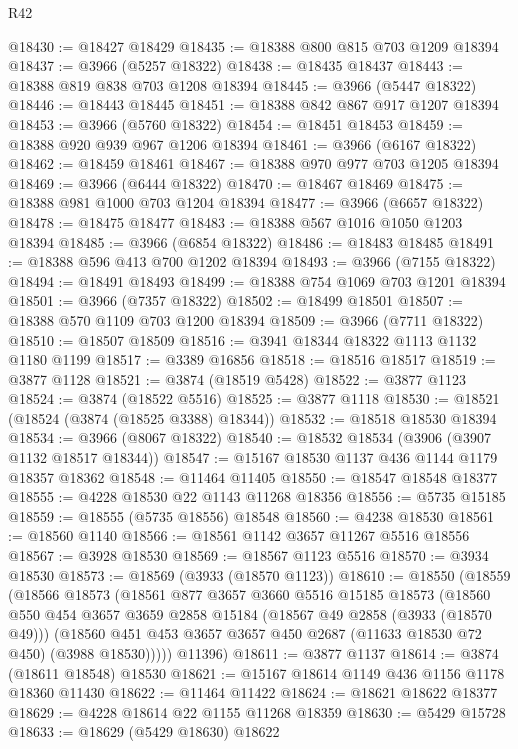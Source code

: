 \begin{lexlean}{R42}
\begin{coremodule}
@18430 := @18427 @18429
@18435 := @18388 @800 @815 @703 @1209 @18394
@18437 := @3966 (@5257 @18322)
@18438 := @18435 @18437
@18443 := @18388 @819 @838 @703 @1208 @18394
@18445 := @3966 (@5447 @18322)
@18446 := @18443 @18445
@18451 := @18388 @842 @867 @917 @1207 @18394
@18453 := @3966 (@5760 @18322)
@18454 := @18451 @18453
@18459 := @18388 @920 @939 @967 @1206 @18394
@18461 := @3966 (@6167 @18322)
@18462 := @18459 @18461
@18467 := @18388 @970 @977 @703 @1205 @18394
@18469 := @3966 (@6444 @18322)
@18470 := @18467 @18469
@18475 := @18388 @981 @1000 @703 @1204 @18394
@18477 := @3966 (@6657 @18322)
@18478 := @18475 @18477
@18483 := @18388 @567 @1016 @1050 @1203 @18394
@18485 := @3966 (@6854 @18322)
@18486 := @18483 @18485
@18491 := @18388 @596 @413 @700 @1202 @18394
@18493 := @3966 (@7155 @18322)
@18494 := @18491 @18493
@18499 := @18388 @754 @1069 @703 @1201 @18394
@18501 := @3966 (@7357 @18322)
@18502 := @18499 @18501
@18507 := @18388 @570 @1109 @703 @1200 @18394
@18509 := @3966 (@7711 @18322)
@18510 := @18507 @18509
@18516 := @3941 @18344 @18322 @1113 @1132 @1180 @1199
@18517 := @3389 @16856
@18518 := @18516 @18517
@18519 := @3877 @1128
@18521 := @3874 (@18519 @5428)
@18522 := @3877 @1123
@18524 := @3874 (@18522 @5516)
@18525 := @3877 @1118
@18530 := @18521 (@18524 (@3874 (@18525 @3388) @18344))
@18532 := @18518 @18530 @18394
@18534 := @3966 (@8067 @18322)
@18540 := @18532 @18534 (@3906 (@3907 @1132 @18517 @18344))
@18547 := @15167 @18530 @1137 @436 @1144 @1179 @18357 @18362
@18548 := @11464 @11405
@18550 := @18547 @18548 @18377
@18555 := @4228 @18530 @22 @1143 @11268 @18356
@18556 := @5735 @15185
@18559 := @18555 (@5735 @18556) @18548
@18560 := @4238 @18530
@18561 := @18560 @1140
@18566 := @18561 @1142 @3657 @11267 @5516 @18556
@18567 := @3928 @18530
@18569 := @18567 @1123 @5516
@18570 := @3934 @18530
@18573 := @18569 (@3933 (@18570 @1123))
@18610 := @18550
    (@18559
      (@18566
        @18573
        (@18561
          @877
          @3657
          @3660
          @5516
          @15185
          @18573
          (@18560
            @550
            @454
            @3657
            @3659
            @2858
            @15184
            (@18567 @49 @2858 (@3933 (@18570 @49)))
            (@18560 @451 @453 @3657 @3657 @450 @2687 (@11633 @18530 @72 @450) (@3988 @18530)))))
      @11396)
@18611 := @3877 @1137
@18614 := @3874 (@18611 @18548) @18530
@18621 := @15167 @18614 @1149 @436 @1156 @1178 @18360 @11430
@18622 := @11464 @11422
@18624 := @18621 @18622 @18377
@18629 := @4228 @18614 @22 @1155 @11268 @18359
@18630 := @5429 @15728
@18633 := @18629 (@5429 @18630) @18622

\end{coremodule}
\end{lexlean}
